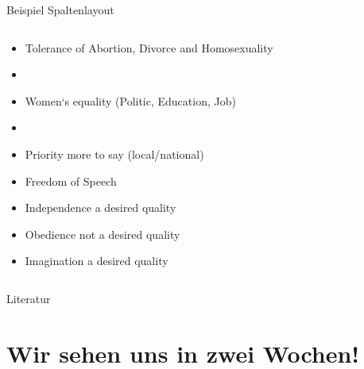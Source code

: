 \documentclass[11pt]{beamer}
\begin{document}
\begin{frame}{Beispiel Spaltenlayout}
\begin{columns}
		\begin{column}{0.7\textwidth}
			\begin{itemize}
				\item Tolerance of Abortion, Divorce and Homosexuality
				\item[]
				\item Women‘s equality (Politic, Education, Job)
				\item[]
				\item Priority more to say (local/national)
				\item Freedom of Speech
				\item Independence a desired quality
				\item Obedience not a desired quality
				\item Imagination a desired quality
			\end{itemize}
		\end{column}
	\end{columns}
\end{frame}


\renewcommand*{\bibfont}{\scriptsize}

\begin{frame}[allowframebreaks]{Literatur}
	\nocite{*}
	\printbibliography[heading = none]
\end{frame}

\section{Wir sehen uns in zwei Wochen!}
\end{document}
